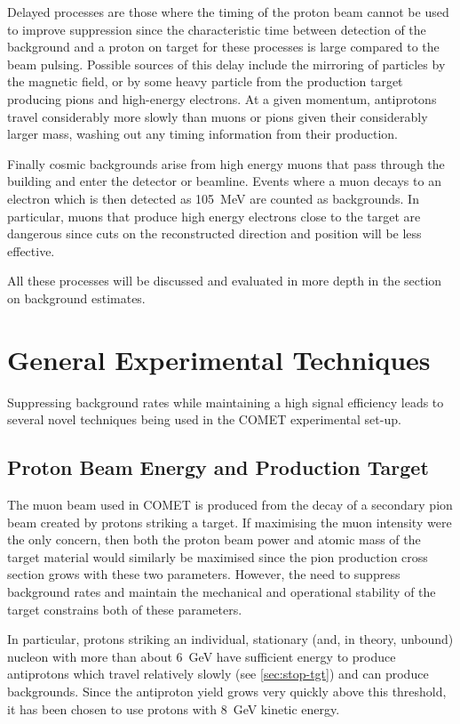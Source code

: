 Delayed processes are those where the timing of the proton beam cannot be used to improve suppression since the characteristic time between detection of the background and a proton on target for these processes is large compared to the beam pulsing.
Possible sources of this delay include the mirroring of particles by the magnetic field, or by some heavy particle from the production target producing pions and high-energy electrons.
At a given momentum, antiprotons travel considerably more slowly than muons or pions given their considerably larger mass, washing out any timing information from their production.

Finally cosmic backgrounds arise from high energy muons that pass through the building and enter the detector or beamline.  
Events where a muon decays to an electron which is then detected as 105~MeV are counted as backgrounds.
In particular, muons that produce high energy electrons close to the target are dangerous since cuts on the reconstructed direction and position will be less effective.

All these processes will be discussed and evaluated in more depth in the section on background estimates.

\section{General Experimental Techniques}
Suppressing background rates while maintaining a high signal efficiency leads to several novel techniques being used in the COMET experimental set-up.

\subsection{Proton Beam Energy and Production Target}
The muon beam used in COMET is produced from the decay of a secondary pion beam created by protons striking a target.
If maximising the muon intensity were the only concern, then both the proton beam power and atomic mass of the target material would similarly be maximised since the pion production cross section
grows with these two parameters.
However, the need to suppress background rates and maintain the mechanical and operational stability of the target constrains both of these parameters.

In particular, protons striking an individual, stationary (and, in theory, unbound) nucleon with more than about 6~GeV have sufficient energy to produce antiprotons which travel relatively slowly (see \ref{sec:stop-tgt}) and can produce backgrounds.
Since the antiproton yield grows very quickly above this threshold, it has been chosen to use protons with 8~GeV kinetic energy.

